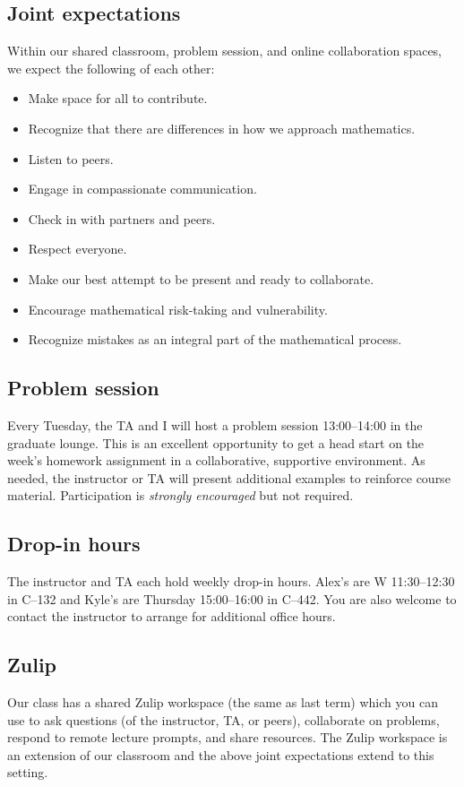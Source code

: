 \documentclass[11pt,twoside]{amsart}
\begin{document}
\subsection*{Joint expectations}
Within our shared classroom, problem session, and online collaboration spaces, we expect the following of each other:
\begin{itemize}
\item Make space for all to contribute.
\item Recognize that there are differences in how we approach mathematics.
\item Listen to peers.
\item Engage in compassionate communication.
\item Check in with partners and peers.
\item Respect everyone.
\item Make our best attempt to be present and ready to collaborate.
\item Encourage mathematical risk-taking and vulnerability.
\item Recognize mistakes as an integral part of the mathematical process.
\end{itemize}

\subsection*{Problem session}
Every Tuesday, the TA and I will host a problem session 13:00--14:00 in the graduate lounge. This is an excellent opportunity to get a head start on the week's homework assignment in a collaborative, supportive environment. As needed, the instructor or TA will present additional examples to reinforce course material. Participation is \emph{strongly encouraged} but not required.

\subsection*{Drop-in hours}
The instructor and TA each hold weekly drop-in hours. Alex's are W 11:30--12:30 in C--132 and Kyle's are Thursday 15:00--16:00 in C--442. You are also welcome to contact the instructor to arrange for additional office hours.

\subsection*{Zulip}
Our class has a shared Zulip workspace (the same as last term) which you can use to ask questions (of the instructor, TA, or peers), collaborate on problems, respond to remote lecture prompts, and share resources. The Zulip workspace is an extension of our classroom and the above joint expectations extend to this setting.
\end{document}
